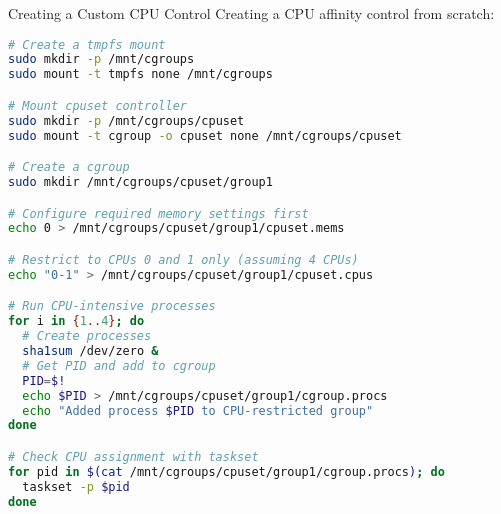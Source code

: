 \begin{example2}{Creating a Custom CPU Control}
    Creating a CPU affinity control from scratch:
    
\begin{lstlisting}[language=bash, style=basesmol]
# Create a tmpfs mount
sudo mkdir -p /mnt/cgroups
sudo mount -t tmpfs none /mnt/cgroups

# Mount cpuset controller
sudo mkdir -p /mnt/cgroups/cpuset
sudo mount -t cgroup -o cpuset none /mnt/cgroups/cpuset

# Create a cgroup
sudo mkdir /mnt/cgroups/cpuset/group1

# Configure required memory settings first
echo 0 > /mnt/cgroups/cpuset/group1/cpuset.mems

# Restrict to CPUs 0 and 1 only (assuming 4 CPUs)
echo "0-1" > /mnt/cgroups/cpuset/group1/cpuset.cpus

# Run CPU-intensive processes
for i in {1..4}; do
  # Create processes
  sha1sum /dev/zero &
  # Get PID and add to cgroup
  PID=$!
  echo $PID > /mnt/cgroups/cpuset/group1/cgroup.procs
  echo "Added process $PID to CPU-restricted group"
done

# Check CPU assignment with taskset
for pid in $(cat /mnt/cgroups/cpuset/group1/cgroup.procs); do
  taskset -p $pid
done
\end{lstlisting}
\end{example2}